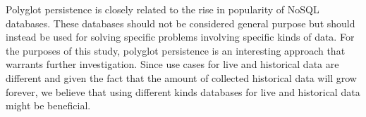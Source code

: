 Polyglot persistence is closely related to the rise in popularity of NoSQL databases. These databases should not be considered general purpose \cite{Catell, polyglotms} but should instead be used for solving specific problems involving specific kinds of data. For the purposes of this study, polyglot persistence is an interesting approach that warrants further investigation. Since use cases for live and historical data are different and given the fact that the amount of collected historical data will grow forever, we believe that using different kinds databases for live and historical data might be beneficial. 




%
%

